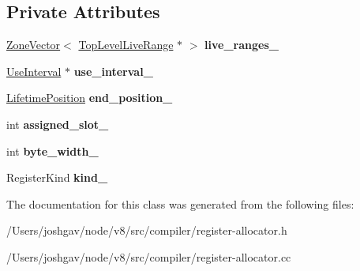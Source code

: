 \subsection*{Private Attributes}
\begin{DoxyCompactItemize}
\item 
\hyperlink{classv8_1_1internal_1_1_zone_vector}{Zone\+Vector}$<$ \hyperlink{classv8_1_1internal_1_1compiler_1_1_top_level_live_range}{Top\+Level\+Live\+Range} $\ast$ $>$ {\bfseries live\+\_\+ranges\+\_\+}\hypertarget{classv8_1_1internal_1_1compiler_1_1_spill_range_aa43f0f215297f576531edd0dd5957d2d}{}\label{classv8_1_1internal_1_1compiler_1_1_spill_range_aa43f0f215297f576531edd0dd5957d2d}

\item 
\hyperlink{classv8_1_1internal_1_1compiler_1_1_use_interval}{Use\+Interval} $\ast$ {\bfseries use\+\_\+interval\+\_\+}\hypertarget{classv8_1_1internal_1_1compiler_1_1_spill_range_a1359cde47a3e7125deb3db04af7b1321}{}\label{classv8_1_1internal_1_1compiler_1_1_spill_range_a1359cde47a3e7125deb3db04af7b1321}

\item 
\hyperlink{classv8_1_1internal_1_1compiler_1_1_lifetime_position}{Lifetime\+Position} {\bfseries end\+\_\+position\+\_\+}\hypertarget{classv8_1_1internal_1_1compiler_1_1_spill_range_ae33bb6548e7d8b0043b44005f4a2ac77}{}\label{classv8_1_1internal_1_1compiler_1_1_spill_range_ae33bb6548e7d8b0043b44005f4a2ac77}

\item 
int {\bfseries assigned\+\_\+slot\+\_\+}\hypertarget{classv8_1_1internal_1_1compiler_1_1_spill_range_a05e9f04a1c643b380f4a8cb8b0084b93}{}\label{classv8_1_1internal_1_1compiler_1_1_spill_range_a05e9f04a1c643b380f4a8cb8b0084b93}

\item 
int {\bfseries byte\+\_\+width\+\_\+}\hypertarget{classv8_1_1internal_1_1compiler_1_1_spill_range_a116ed635a1fcdd4cbfeef91f97677fcf}{}\label{classv8_1_1internal_1_1compiler_1_1_spill_range_a116ed635a1fcdd4cbfeef91f97677fcf}

\item 
Register\+Kind {\bfseries kind\+\_\+}\hypertarget{classv8_1_1internal_1_1compiler_1_1_spill_range_aae3327ce52ec541a7ed01374845a4b38}{}\label{classv8_1_1internal_1_1compiler_1_1_spill_range_aae3327ce52ec541a7ed01374845a4b38}

\end{DoxyCompactItemize}


The documentation for this class was generated from the following files\+:\begin{DoxyCompactItemize}
\item 
/\+Users/joshgav/node/v8/src/compiler/register-\/allocator.\+h\item 
/\+Users/joshgav/node/v8/src/compiler/register-\/allocator.\+cc\end{DoxyCompactItemize}

